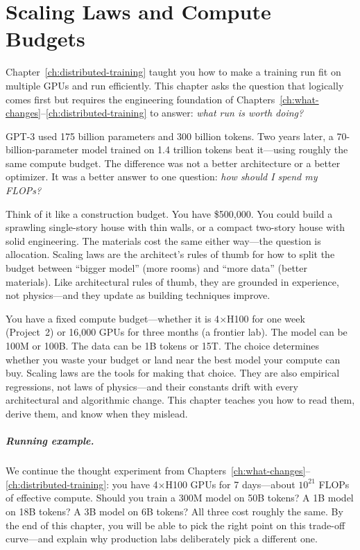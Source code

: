 \chapter{Scaling Laws and Compute Budgets}
\label{ch:scaling-laws}

Chapter~\ref{ch:distributed-training} taught you how to make a training run fit on multiple GPUs and run efficiently. This chapter asks the question that logically comes first but requires the engineering foundation of Chapters~\ref{ch:what-changes}--\ref{ch:distributed-training} to answer: \emph{what run is worth doing?}

GPT-3 used 175 billion parameters and 300 billion tokens. Two years later, a 70-billion-parameter model trained on 1.4 trillion tokens beat it---using roughly the same compute budget. The difference was not a better architecture or a better optimizer. It was a better answer to one question: \emph{how should I spend my FLOPs?}

Think of it like a construction budget. You have \$500{,}000. You could build a sprawling single-story house with thin walls, or a compact two-story house with solid engineering. The materials cost the same either way---the question is allocation. Scaling laws are the architect's rules of thumb for how to split the budget between ``bigger model'' (more rooms) and ``more data'' (better materials). Like architectural rules of thumb, they are grounded in experience, not physics---and they update as building techniques improve.

You have a fixed compute budget---whether it is 4$\times$H100 for one week (Project~2) or 16,000 GPUs for three months (a frontier lab). The model can be 100M or 100B. The data can be 1B tokens or 15T. The choice determines whether you waste your budget or land near the best model your compute can buy. Scaling laws are the tools for making that choice. They are also empirical regressions, not laws of physics---and their constants drift with every architectural and algorithmic change. This chapter teaches you how to read them, derive them, and know when they mislead.

\paragraph{Running example.} We continue the thought experiment from Chapters~\ref{ch:what-changes}--\ref{ch:distributed-training}: you have 4$\times$H100 GPUs for 7 days---about $10^{21}$ FLOPs of effective compute. Should you train a 300M model on 50B tokens? A 1B model on 18B tokens? A 3B model on 6B tokens? All three cost roughly the same. By the end of this chapter, you will be able to pick the right point on this trade-off curve---and explain why production labs deliberately pick a different one.


